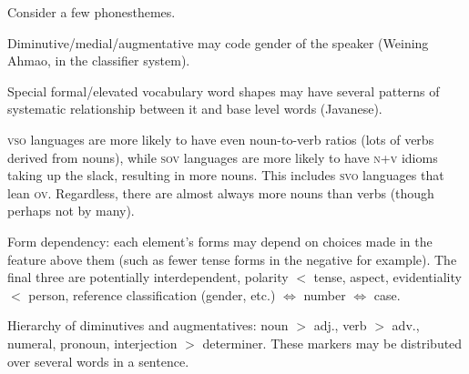 \documentclass[11pt]{article}
\newcommand{\I}[1]{\textsc{#1}}   %
\begin{document}
Consider a few phonesthemes.

Diminutive/medial/augmentative may code gender of the speaker (Weining
Ahmao, in the classifier system).

Special formal/elevated vocabulary word shapes may have several
patterns of systematic relationship between it and base level words
(Javanese).

\I{vso} languages are more likely to have even noun-to-verb ratios
(lots of verbs derived from nouns), while \I{sov} languages are more
likely to have \I{n+v} idioms taking up the slack, resulting in more
nouns.  This includes \I{svo} languages that lean \I{ov}.  Regardless,
there are almost always more nouns than verbs (though perhaps not by
many).

Form dependency: each element's forms may depend on choices made in
the feature above them (such as fewer tense forms in the negative for
example).  The final three are potentially interdependent, polarity
$<$ tense, aspect, evidentiality $<$ person, reference classification
(gender, etc.) $\Leftrightarrow$ number $\Leftrightarrow$ case.

Hierarchy of diminutives and augmentatives: noun $>$ adj., verb $>$
adv., numeral, pronoun, interjection $>$ determiner.  These markers
may be distributed over several words in a sentence.
\end{document}
